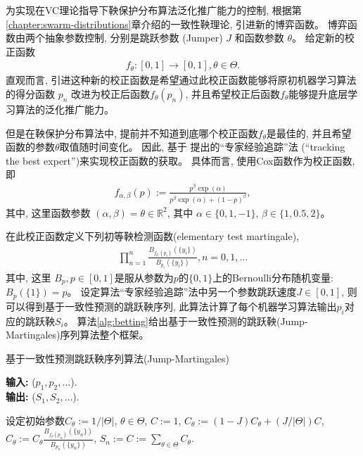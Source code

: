 为实现在VC理论指导下鞅保护分布算法泛化推广能力的控制, 根据第\ref{chapter:swarm-distributions}章介绍的一致性鞅理论, 引进新的博弈函数。 博弈函数由两个抽象参数控制, 分别是跳跃参数 (Jumper) $J$ 和函数参数 $\theta$。 给定新的校正函数
\begin{align}
f_{\theta}: [0,1] \rightarrow [0,1], \theta \in \Theta.
\end{align}
直观而言, 引进这种新的校正函数是希望通过此校正函数能够将原初机器学习算法的得分函数 $p_{n}$ 改进为校正后函数$f_{\theta}(p_{n})$, 并且希望校正后函数$f_{\theta}$能够提升底层学习算法的泛化推广能力。 

但是在鞅保护分布算法中, 提前并不知道到底哪个校正函数$f_{\theta}$是最佳的, 并且希望函数的参数$\theta$取值随时间变化。 因此, 基于 \citet{Vovk2021protectedclassification} 提出的“专家经验追踪”法 (“tracking the best expert”)来实现校正函数的获取。 具体而言, 使用Cox函数作为校正函数, 即
\begin{align}
f_{\alpha,\beta}(p):=\frac{p^{\beta}\exp(\alpha)}{p^{\beta}\exp(\alpha) + (1-p)^{\beta}},
\end{align}
其中, 这里函数参数 $(\alpha,\beta) = \theta \in \mathbb{R}^2$, 其中 $\alpha \in \{0,1,-1\}$, $\beta \in \{1,0.5,2\}$。 

在此校正函数定义下列初等鞅检测函数(elementary test martingale),
\begin{align}
\prod_{n=1}^{n}\frac{B_{f_{\theta_{i}}(p_{i})}(\{y_{i}\})}{B_{p_{i}}(\{y_{i}\})},n=0,1,\ldots
\end{align}
其中, 这里 $B_{p}, p \in [0,1]$是服从参数为$p$的$\{0,1\}$上的Bernoulli分布随机变量: $B_{p}(\{1\}) = p$。 设定算法“专家经验追踪”法中另一个参数跳跃速度$J \in [0,1]$, 则可以得到基于一致性预测的跳跃鞅序列, 此算法计算了每个机器学习算法输出$p_{i}$对应的跳跃鞅$S_{i}$。 算法\ref{alg:betting}给出基于一致性预测的跳跃鞅(Jump-Martingales)序列算法整个框架。

\begin{algorithm}[!htbp]
    \small
    \caption{基于一致性预测跳跃鞅序列算法(Jump-Martingales)}
    \label{alg:betting}
    \hspace*{\algorithmicindent} \textbf{输入:} {($p_{1}, p_{2}, \ldots$).}\\
    \hspace*{\algorithmicindent} \textbf{输出:} {($S_{1}, S_{2}, \ldots$).}
    \begin{algorithmic}[1]
        \State 设定初始参数$C_{\theta} := 1/|\Theta|$, $\theta \in \Theta$,
    		\State $C := 1$,
        \For{$\theta \in \Theta$}
        \State $C_{\theta} := (1-J)C_{\theta} + (J/|\Theta|)C$,
        \EndFor
        \For{$\theta \in \Theta$}
        \State $C_{\theta} := C_{\theta}\frac{B_{f_{\theta}(p_{n})}(\{y_{n}\})}{B_{p_{n}}(\{y_{n}\})}$,
        \EndFor
        \State $S_{n} := C := \sum_{\theta \in \Theta}^{} C_{\theta}$.
        \EndFor
        \EndProcedure
    \end{algorithmic}
\end{algorithm}

